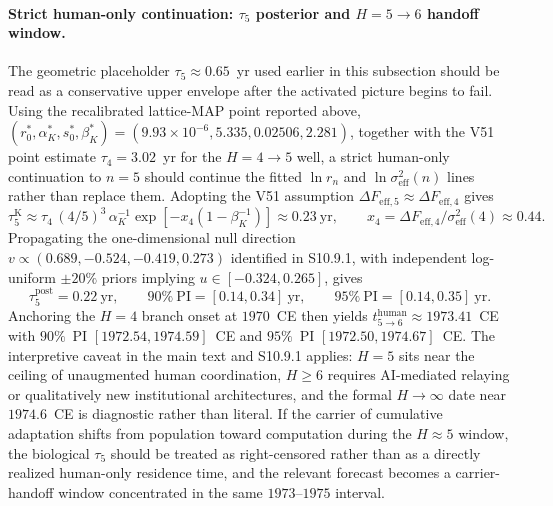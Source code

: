 \documentclass[11pt]{article}
\begin{document}
\paragraph{Strict human-only continuation: $\tau_5$ posterior and $H{=}5\to6$ handoff window.}
The geometric placeholder $\tau_5\approx 0.65$~yr used earlier in this subsection should be read as a conservative upper envelope after the activated picture begins to fail.  Using the recalibrated lattice-MAP point reported above, $(r_0^*,\alpha_K^*,s_0^*,\beta_K^*)=(9.93\times 10^{-6},5.335,0.02506,2.281)$, together with the V51 point estimate $\tau_4=3.02$~yr for the $H{=}4\to5$ well, a strict human-only continuation to $n{=}5$ should continue the fitted $\ln r_n$ and $\ln\sigma_{\mathrm{eff}}^2(n)$ lines rather than replace them.  Adopting the V51 assumption $\Delta F_{\mathrm{eff},5}\approx\Delta F_{\mathrm{eff},4}$ gives
\[
\tau_5^{\mathrm{K}}\approx \tau_4\,(4/5)^3\,\alpha_K^{-1}\exp\!\left[-x_4(1-\beta_K^{-1})\right]\approx 0.23~\mathrm{yr},\qquad x_4=\Delta F_{\mathrm{eff},4}/\sigma_{\mathrm{eff}}^2(4)\approx 0.44.
\]
Propagating the one-dimensional null direction $v\propto(0.689,-0.524,-0.419,0.273)$ identified in S10.9.1, with independent log-uniform $\pm 20\%$ priors implying $u\in[-0.324,0.265]$, gives
\[
\tau_5^{\mathrm{post}}=0.22~\mathrm{yr},\qquad 90\%~\mathrm{PI}=[0.14,0.34]~\mathrm{yr},\qquad 95\%~\mathrm{PI}=[0.14,0.35]~\mathrm{yr}.
\]
Anchoring the $H{=}4$ branch onset at $1970$~CE then yields $t_{5\to6}^{\mathrm{human}}\approx 1973.41$~CE with $90\%$~PI $[1972.54,1974.59]$~CE and $95\%$~PI $[1972.50,1974.67]$~CE.  The interpretive caveat in the main text and S10.9.1 applies: $H{=}5$ sits near the ceiling of unaugmented human coordination, $H{\ge}6$ requires AI-mediated relaying or qualitatively new institutional architectures, and the formal $H{\to}\infty$ date near $1974.6$~CE is diagnostic rather than literal.  If the carrier of cumulative adaptation shifts from population toward computation during the $H{\approx}5$ window, the biological $\tau_5$ should be treated as right-censored rather than as a directly realized human-only residence time, and the relevant forecast becomes a carrier-handoff window concentrated in the same $1973$--$1975$ interval.

\end{document}
